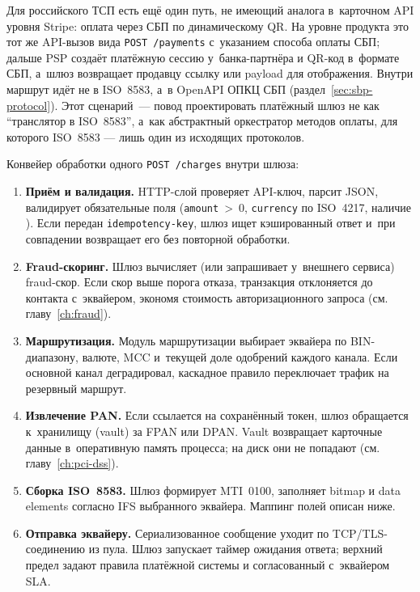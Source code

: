 Для российского ТСП есть ещё один путь, не имеющий аналога
в~карточном API уровня Stripe: оплата через СБП по динамическому
QR. На уровне продукта это тот же API-вызов вида
\texttt{POST~/payments} с~указанием способа оплаты СБП;
дальше PSP создаёт платёжную сессию у~банка-партнёра и QR-код
в~формате СБП, а~шлюз возвращает продавцу ссылку или payload
для отображения. Внутри маршрут идёт не в ISO~8583, а~в OpenAPI
ОПКЦ СБП (раздел~\ref{sec:sbp-protocol}). Этот сценарий~---
повод проектировать платёжный шлюз не как \enquote{транслятор
в ISO~8583}, а~как абстрактный оркестратор методов оплаты,
для которого ISO~8583 --- лишь один из исходящих протоколов.

Конвейер обработки одного \texttt{POST~/charges} внутри шлюза:

\begin{enumerate}
  \item \textbf{Приём и валидация.} HTTP-слой проверяет
    API-ключ, парсит JSON, валидирует обязательные поля
    (\texttt{amount}~>~0, \texttt{currency} по ISO~4217,
    наличие ). Если передан
    \texttt{idempotency-key}, шлюз ищет кэшированный ответ
    и~при совпадении возвращает его без повторной обработки.
  \item \textbf{Fraud-скоринг.} Шлюз вычисляет (или запрашивает
    у~внешнего сервиса) fraud-скор. Если скор выше порога
    отказа, транзакция отклоняется до контакта с~эквайером,
    экономя стоимость авторизационного запроса
    (см. главу~\ref{ch:fraud}).
  \item \textbf{Маршрутизация.} Модуль маршрутизации выбирает
    эквайера по BIN-диапазону, валюте, MCC и~текущей доле
    одобрений каждого канала. Если основной канал деградировал,
    каскадное правило переключает трафик на резервный маршрут.
  \item \textbf{Извлечение PAN.} Если 
    ссылается на сохранённый токен, шлюз обращается к~хранилищу
    (vault) за FPAN или DPAN. Vault возвращает карточные данные
    в~оперативную память процесса; на диск они не попадают
    (см. главу~\ref{ch:pci-dss}).
  \item \textbf{Сборка ISO~8583.} Шлюз формирует MTI~0100,
    заполняет bitmap и data elements согласно IFS выбранного
    эквайера. Маппинг полей описан ниже.
  \item \textbf{Отправка эквайеру.} Сериализованное сообщение
    уходит по TCP/TLS-соединению из пула. Шлюз запускает
    таймер ожидания ответа; верхний предел задают правила
    платёжной системы и согласованный с~эквайером SLA.

\end{enumerate}
